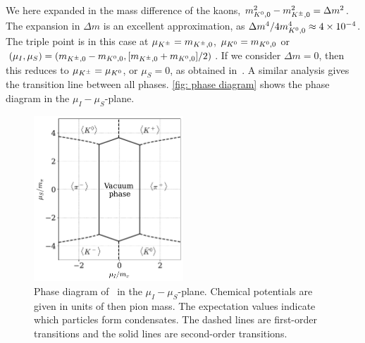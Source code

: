 %
We here expanded in the mass difference of the kaons, $m_{{K^0},0}^2 - m_{{K^\pm},0}^2 = \Delta m^2$.
The expansion in $\Delta m$ is an excellent approximation, as $\Delta m^4 / 4 m_{{K^0},0}^4 \approx 4 \times 10^{-4}$.
The triple point is in this case at $\mu_{K^\pm} = m_{{K^\pm},0}$, $\mu_{K^0} = m_{{K^0},0}$ or $(\mu_I, \mu_S) = (m_{{K^\pm},0} - m_{{K^0},0}, [m_{{K^\pm},0}+m_{{K^0},0}]/2)$.
If we consider $\Delta m = 0$, then this reduces to $ \mu_{K^\pm} = \mu_{K^0}$, or $\mu_S = 0$, as obtained in~\autocite{kogutQCDSmallNonzero2001}.
A similar analysis gives the transition line between all phases.
\autoref{fig: phase diagram} shows the phase diagram in the $\mu_I-\mu_S$-plane.

\begin{figure}[h]
    \centering
    \includegraphics[width=0.5\textwidth]{../scripts/figurer/phase_diagram.pdf}
    \hspace{2mm}
    \caption{
        Phase diagram of \chpt\ in the $\mu_I-\mu_S$-plane.
        Chemical potentials are given in units of then pion mass.
        The expectation values indicate which particles form condensates.
        The dashed lines are first-order transitions and the solid lines are second-order transitions.
        }
    \label{fig: phase diagram}
\end{figure}

